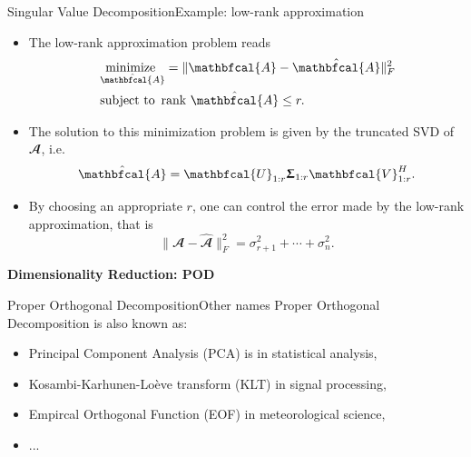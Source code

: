\documentclass[usenames,dvipsnames,svgnames,10pt,aspectratio=169]{beamer}
\DeclareMathOperator*{\minimize}{minimize~}
\DeclareMathOperator*{\subjectto}{subject~to~}
\begin{document}
\begin{frame}[t, c]{Singular Value Decomposition}{Example: low-rank approximation}
	\begin{itemize}
		\item The low-rank approximation problem reads
		\begin{equation}
			\begin{aligned}
				& \minimize_{\hat{\mathbfcal{A}}} = \| \mathbfcal{A} - \hat{\mathbfcal{A}} \|_F^2 \\
				& \subjectto \text{rank } \hat{\mathbfcal{A}} \leq r.
			\end{aligned}
			\notag
		\end{equation}

		\bigskip

		\item The solution to this minimization problem is given by the truncated SVD of $\mathbfcal{A}$, i.e.\
		$$\hat{\mathbfcal{A}} = \mathbfcal{U}_{1:r} \boldsymbol{\Upsigma}_{1:r} \mathbfcal{V}^H_{1:r}.$$

		\bigskip

		\item By choosing an appropriate $r$, one can control the error made by the low-rank approximation, that is
		$$\| \mathbfcal{A} - \hat{\mathbfcal{A}} \|_F^2 = \sigma^2_{r+1} + \cdots + \sigma_n^2.$$
	\end{itemize}

	\vspace{1cm}
\end{frame}

\begin{frame}[t, c]{}
	\centering
	\vspace{1cm}

	{\Large \textbf{Dimensionality Reduction: POD}}

	\bigskip

	{}

\end{frame}

\begin{frame}[t, c]{Proper Orthogonal Decomposition}{Other names}
	Proper Orthogonal Decomposition is also known as:
	\begin{itemize}
		\item Principal Component Analysis (PCA) is in statistical analysis,
		\item Kosambi-Karhunen-Loève transform (KLT) in signal processing,
		\item Empircal Orthogonal Function (EOF) in meteorological science,
		\item ...
	\end{itemize}

	\vspace{1cm}
\end{frame}
\end{document}
